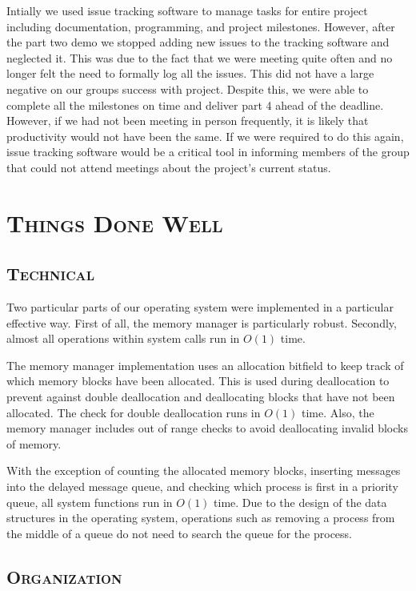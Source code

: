 \documentclass[oneside]{report}
\begin{document}
Intially we used issue tracking software to manage tasks for entire project
including documentation, programming, and project milestones. However, after
the part two demo we stopped adding new issues to the tracking software and
neglected it. This was due to the fact that we were meeting quite often and no
longer felt the need to formally log all the issues. This did not have a large
negative on our groups success with project. Despite this, we were able to
complete all the milestones on time and deliver part 4 ahead of the deadline.
However, if we had not been meeting in person frequently, it is likely that
productivity would not have been the same. If we were required to do this
again, issue tracking software would be a critical tool in informing members of
the group that could not attend meetings about the project's current status.

\section{\textsc{Things Done Well}}

\subsection{\textsc{Technical}}

Two particular parts of our operating system were implemented in a particular
effective way. First of all, the memory manager is particularly robust.
Secondly, almost all operations within system calls run in $O(1)$ time.

The memory manager implementation uses an allocation bitfield to keep track of
which memory blocks have been allocated. This is used during deallocation to
prevent against double deallocation and deallocating blocks that have not been
allocated. The check for double deallocation runs in $O(1)$ time. Also, the
memory manager includes out of range checks to avoid deallocating invalid
blocks of memory.

With the exception of counting the allocated memory blocks, inserting messages
into the delayed message queue, and checking which process is first in a
priority queue, all system functions run in $O(1)$ time. Due to the design of
the data structures in the operating system, operations such as removing a
process from the middle of a queue do not need to search the queue for the
process.

\subsection{\textsc{Organization}}
\end{document}
